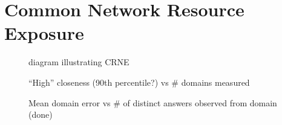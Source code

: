 \section{Common Network Resource Exposure} \label{sect:crne}

\begin{figure}
    \caption{diagram illustrating CRNE}
\end{figure}

\begin{figure}
    \caption{“High” closeness (90th percentile?) vs # domains measured}
\end{figure}

\begin{figure}
    \caption{Mean domain error vs # of distinct answers observed from domain (done)}
\end{figure}

